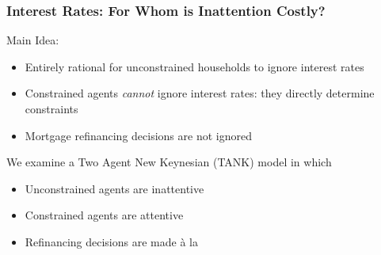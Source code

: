 \documentclass{beamer}
\begin{document}
\frame
{
	\frametitle{Interest Rates: For Whom is Inattention Costly?}
	Main Idea:
	\begin{itemize}
		\item Entirely rational for unconstrained households to ignore interest rates 
		\item Constrained agents \textit{cannot} ignore interest rates: they directly determine constraints
		\item Mortgage refinancing decisions are not ignored
	\end{itemize}
	\pause
	\bigskip
	We examine a Two Agent New Keynesian (TANK) model in which
	\begin{itemize}
		\item Unconstrained agents are inattentive
		\item Constrained agents are attentive
		\item Refinancing decisions are made \`a la \cite{greenwald_mortgage_2018}
	\end{itemize}
}
\end{document}
